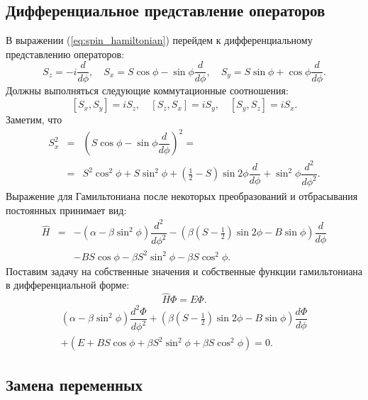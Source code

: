 \documentclass[12pt]{article}
\begin{document}
\subsection*{Дифференциальное представление операторов}

В выражении (\ref{eq:spin_hamiltonian}) перейдем к дифференциальному представлению операторов:
%
\begin{equation}
S_z = -i \dfrac{d}{d \phi}, \quad S_x = S \cos \phi - \sin \phi \dfrac{d}{d \phi}, \quad S_y = S \sin \phi + \cos \phi \dfrac{d}{d \phi}.
\label{eq:diff_repr}
\end{equation}
%
Должны выполняться следующие коммутационные соотношения:
%
$$[S_x, S_y] = iS_z, \quad [S_z, S_x] = iS_y, \quad [S_y, S_z] = iS_x.$$
%
Заметим, что
%
\begin{equation}
\begin{array}{lcl}
	S_x^2 & = & (S \cos \phi - \sin \phi \dfrac{d}{d \phi})^2 = \\
	& = & S^2 \cos^2 \phi + S \sin^2 \phi + (\frac{1}{2} - S) \sin 2 \phi \dfrac{d}{d \phi} + \sin^2 \phi \dfrac{d^2}{d \phi^2}.
\end{array}
\end{equation}
%
Выражение для Гамильтониана после некоторых преобразований и отбрасывания постоянных принимает вид:
%
\begin{equation*}
\begin{array}{lcl}
	\hat{H} & = & -(\alpha - \beta \sin^2 \phi) \dfrac{d^2}{d \phi^2} - (\beta (S - \frac{1}{2}) \sin 2 \phi - B \sin \phi) \dfrac{d}{d \phi} \\[10pt]
	&& - BS \cos \phi - \beta S^2 \sin^2 \phi - \beta S \cos^2 \phi.
\end{array}
\end{equation*}
%
Поставим задачу на собственные значения и собственные функции гамильтониана в дифференциальной форме:
%
\begin{equation}
\hat{H} \Phi = E \Phi.
\end{equation}
%
\begin{equation}
\begin{array}{l}
	(\alpha - \beta \sin^2 \phi) \dfrac{d^2 \Phi}{d \phi^2} + (\beta (S - \frac{1}{2}) \sin 2\phi - B \sin \phi) \dfrac{d \Phi}{d \phi} \\[10pt]
	+ (E + BS \cos \phi + \beta S^2 \sin^2 \phi + \beta S \cos^2 \phi) = 0.
\end{array}
\end{equation}

\subsection*{Замена переменных}
\end{document}
